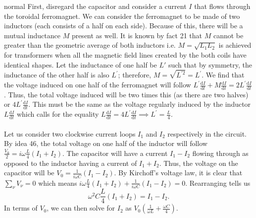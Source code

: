 \begin{solution}{normal}
First, disregard the capacitor and consider a current $I$ that flows through the toroidal ferromagnet. We can consider the ferromagnet to be made of two inductors (each consists of a half on each side). Because of this, there will be a mutual inductance $M$ present as well. It is known by fact 21 that $M$ cannot be greater than the geometric average of both inductors i.e. $M = \sqrt{L_1 L_2}$ is achieved for transformers when all the magnetic field lines created by the both coils have identical shapes. Let the inductance of one half be $L'$ such that by symmetry, the inductance of the other half is also $L^\prime$; therefore, $M = \sqrt{L^{\prime 2}} = L^{\prime}$. We find that the voltage induced on one half of the ferromagnet will follow $L^\prime \frac{\text{d}I}{\text{d}t} + M \frac{\text{d}I}{\text{d}t} = 2L^\prime \frac{\text{d}I}{\text{d}t}$. Thus, the total voltage induced will be two times this (as there are two halves) or $4L^\prime \frac{\text{d}I}{\text{d}t}$. This must be the same as the voltage regularly induced by the inductor $L\frac{\text{d}I}{\text{d}t}$ which calls for the equality $L\frac{\text{d}I}{\text{d}t} = 4L^\prime \frac{\text{d}I}{\text{d}t} \implies L^\prime = \frac{L}{4}$. 
\\
\\
Let us consider two clockwise current loops $I_1$ and $I_2$ respectively in the circuit. By idea 46, the total voltage on one half of the inductor will follow $\frac{V_0}{2} = i\omega \frac{L}{4}(I_1 + I_2)$. The capacitor will have a current $I_1 - I_2$ flowing through as opposed to the inductor having a current of $I_1 + I_2$. Thus, the voltage on the capacitor will be $V_0 = \frac{1}{i\omega C} (I_1 - I_2)$. By Kirchoff's voltage law, it is clear that $\sum_{\nu} V_\nu = 0$ which means $i \omega \frac{L}{4} (I_1 + I_2) + \frac{1}{i\omega C} (I_1 - I_2) = 0$. Rearranging tells us 
\[\omega^2 C\frac{L}{4} (I_1 + I_2) = I_1 - I_2.\]
In terms of $V_0$, we can then solve for $I_2$ as $V_0 \left(\frac{1}{\omega L} + \frac{\omega C}{4}\right)$.
\end{solution}